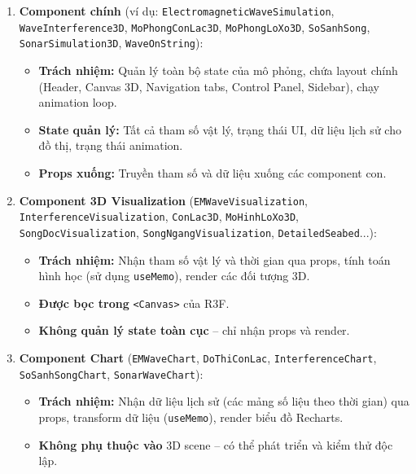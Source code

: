 \begin{enumerate}
    \item \textbf{Component chính} (ví dụ: \texttt{ElectromagneticWaveSimulation}, \texttt{WaveInterference3D}, \texttt{MoPhongConLac3D}, \texttt{MoPhongLoXo3D}, \texttt{SoSanhSong}, \texttt{SonarSimulation3D}, \texttt{WaveOnString}):
    \begin{itemize}
        \item \textbf{Trách nhiệm:} Quản lý toàn bộ state của mô phỏng, chứa layout chính (Header, Canvas 3D, Navigation tabs, Control Panel, Sidebar), chạy animation loop.
        \item \textbf{State quản lý:} Tất cả tham số vật lý, trạng thái UI, dữ liệu lịch sử cho đồ thị, trạng thái animation.
        \item \textbf{Props xuống:} Truyền tham số và dữ liệu xuống các component con.
    \end{itemize}
    
    \item \textbf{Component 3D Visualization} (\texttt{EMWaveVisualization}, \texttt{InterferenceVisualization}, \texttt{ConLac3D}, \texttt{MoHinhLoXo3D}, \texttt{SongDocVisualization}, \texttt{SongNgangVisualization}, \texttt{DetailedSeabed}...):
    \begin{itemize}
        \item \textbf{Trách nhiệm:} Nhận tham số vật lý và thời gian qua props, tính toán hình học (sử dụng \texttt{useMemo}), render các đối tượng 3D.
        \item \textbf{Được bọc trong} \texttt{<Canvas>} của R3F.
        \item \textbf{Không quản lý state toàn cục} – chỉ nhận props và render.
    \end{itemize}
    
    \item \textbf{Component Chart} (\texttt{EMWaveChart}, \texttt{DoThiConLac}, \texttt{InterferenceChart}, \texttt{SoSanhSongChart}, \texttt{SonarWaveChart}):
    \begin{itemize}
        \item \textbf{Trách nhiệm:} Nhận dữ liệu lịch sử (các mảng số liệu theo thời gian) qua props, transform dữ liệu (\texttt{useMemo}), render biểu đồ Recharts.
        \item \textbf{Không phụ thuộc vào} 3D scene – có thể phát triển và kiểm thử độc lập.
    \end{itemize}
    

\end{enumerate}
